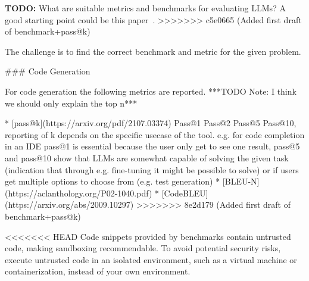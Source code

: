 \documentclass[11pt]{article}
\begin{document}



\textbf{TODO:} What are suitable metrics and benchmarks for evaluating LLMs? A good starting point could be this paper~\cite{10.1145/3695988}.
>>>>>>> c5e0665 (Added first draft of benchmark+pass@k)


%

The challenge is to find the correct benchmark and metric for the given problem.

### Code Generation

For code generation the following metrics are reported. ***TODO Note: I think we should only explain the top n***

* [pass@k](https://arxiv.org/pdf/2107.03374) Pass@1 Pass@2 Pass@5 Pass@10, reporting of k depends on the specific usecase of the tool. e.g. for code completion in an IDE pass@1 is essential because the user only get to see one result, pass@5 and pass@10 show that LLMs are somewhat capable of solving the given task (indication that through e.g. fine-tuning it might be possible to solve) or if users get multiple options to choose from (e.g. test generation)
* [BLEU-N](https://aclanthology.org/P02-1040.pdf)
* [CodeBLEU](https://arxiv.org/abs/2009.10297)
>>>>>>> 8e2d179 (Added first draft of benchmark+pass@k)

<<<<<<< HEAD
Code snippets provided by benchmarks contain untrusted code, making sandboxing recommendable.
To avoid potential security risks, execute untrusted code in an isolated environment, such as a virtual machine or containerization, instead of your own environment.
\end{document}
